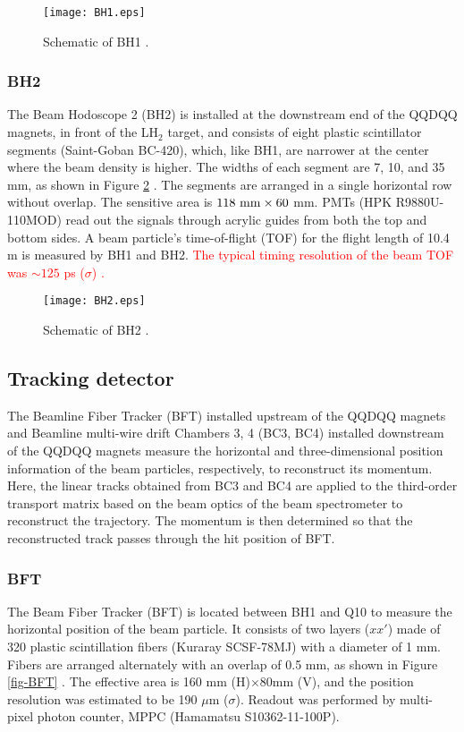 \begin{figure}[!h]
 \begin{center}
   \texttt{[image: BH1.eps]}
   \caption{Schematic of BH1 \cite{Honda-D}.}
   \label{fig-BH1}
 \end{center}
\end{figure}

\subsubsection{BH2}
The Beam Hodoscope 2 (BH2) \cite{BH2} is installed at the downstream end of the QQDQQ magnets, in front of the LH$_2$ target, and consists of eight plastic scintillator segments (Saint-Goban BC-420), which, like BH1, are narrower at the center where the beam density is higher. The widths of each segment are 7, 10, and 35 mm, as shown in Figure \ref{fig-BH2} \cite{Honda-D}. The segments are arranged in a single horizontal row without overlap. The sensitive area is $118\ \rm{mm}\times60$ mm. PMTs (HPK R9880U-110MOD) read out the signals through acrylic guides from both the top and bottom sides. A beam particle's time-of-flight (TOF) for the flight length of 10.4 m is measured by BH1 and BH2. \textcolor{red}{The typical timing resolution of the beam TOF was $\sim125$ ps ($\sigma$) \cite{BH2}.}

\begin{figure}[!h]
 \begin{center}
   \texttt{[image: BH2.eps]}
   \caption{Schematic of BH2 \cite{Honda-D}.}
   \label{fig-BH2}
 \end{center}
\end{figure}

\subsection{Tracking detector}
The Beamline Fiber Tracker (BFT) installed upstream of the QQDQQ magnets and Beamline multi-wire drift Chambers 3, 4 (BC3, BC4) installed downstream of the QQDQQ magnets measure the horizontal and three-dimensional position information of the beam particles, respectively, to reconstruct its momentum. Here, the linear tracks obtained from BC3 and BC4 are applied to the third-order transport matrix based on the beam optics of the beam spectrometer to reconstruct the trajectory. The momentum is then determined so that the reconstructed track passes through the hit position of BFT.

\subsubsection{BFT}
The Beam Fiber Tracker (BFT) is located between BH1 and Q10 to measure the horizontal position of the beam particle. It consists of two layers ($xx'$) made of 320 plastic scintillation fibers (Kuraray SCSF-78MJ) with a diameter of 1 mm. Fibers are arranged alternately with an overlap of 0.5 mm, as shown in Figure \ref{fig-BFT} \cite{Honda-D}. The effective area is 160 mm (H)$\times$80mm (V), and the position resolution was estimated to be 190 $\mu$m ($\sigma$). Readout was performed by multi-pixel photon counter, MPPC (Hamamatsu S10362-11-100P).


